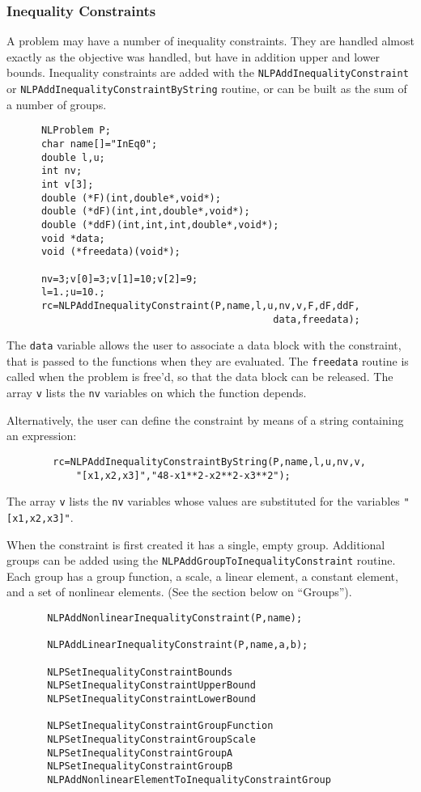 \documentclass[12pt]{article}
\begin{document}
   \subsubsection{Inequality Constraints}

     A problem may have a number of inequality constraints. They are handled almost exactly as the objective was handled,
     but have in addition upper and lower bounds. Inequality constraints are added with the {\tt NLPAdd\-Inequality\-Constraint}
     or {\tt NLPAdd\-Inequality\-Constraint\-ByString} routine, or can be built as the sum of a number of groups.
     \begin{verbatim}
      NLProblem P;
      char name[]="InEq0";
      double l,u;
      int nv;
      int v[3];
      double (*F)(int,double*,void*);
      double (*dF)(int,int,double*,void*);
      double (*ddF)(int,int,int,double*,void*);
      void *data;
      void (*freedata)(void*);

      nv=3;v[0]=3;v[1]=10;v[2]=9;
      l=1.;u=10.;
      rc=NLPAddInequalityConstraint(P,name,l,u,nv,v,F,dF,ddF,
                                              data,freedata);
     \end{verbatim}
     The {\tt data} variable allows the user to associate a data block with the constraint, that is passed to the
     functions when they are evaluated. The {\tt freedata} routine is called when the problem is free'd, so that
     the data block can be released. The array {\tt v} lists the {\tt nv} variables on which the function depends.

     Alternatively, the user can define the constraint by means of a string containing an expression:
     \begin{verbatim}
        rc=NLPAddInequalityConstraintByString(P,name,l,u,nv,v,
            "[x1,x2,x3]","48-x1**2-x2**2-x3**2");
     \end{verbatim}
     The array {\tt v} lists the {\tt nv} variables whose values are substituted for the variables
     {\tt "[x1,x2,x3]"}.

     When the constraint is first created it has a single, empty group. Additional groups can be added using the
     {\tt NLPAdd\-Group\-To\-Inequality\-Constraint} routine. Each group has a group function, a scale, a linear element,
     a constant element, and a set of nonlinear elements. (See the section below on ``Groups'').
     \begin{verbatim}
       NLPAddNonlinearInequalityConstraint(P,name);

       NLPAddLinearInequalityConstraint(P,name,a,b);

       NLPSetInequalityConstraintBounds
       NLPSetInequalityConstraintUpperBound
       NLPSetInequalityConstraintLowerBound

       NLPSetInequalityConstraintGroupFunction
       NLPSetInequalityConstraintGroupScale
       NLPSetInequalityConstraintGroupA
       NLPSetInequalityConstraintGroupB
       NLPAddNonlinearElementToInequalityConstraintGroup
     \end{verbatim}
\end{document}
